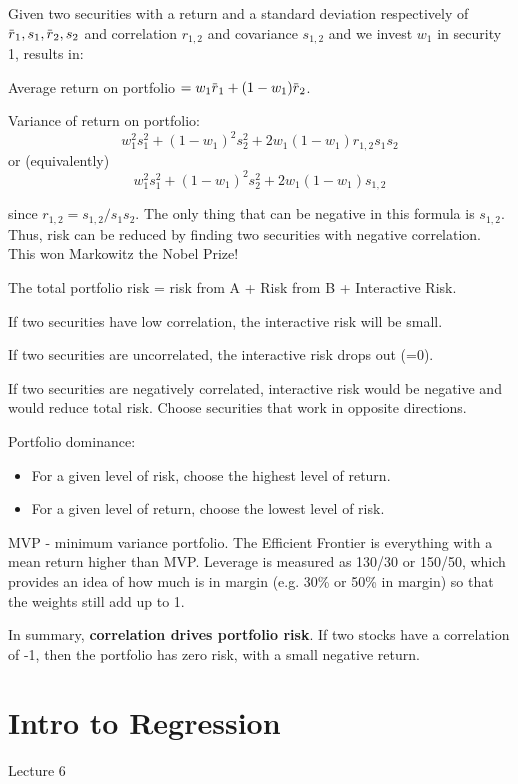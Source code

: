 \documentclass[11pt, oneside]{article}   	%
\newcommand{\overbar}[1]{\mkern 1.5mu\overline{\mkern-1.5mu#1\mkern-1.5mu}\mkern 1.5mu}
\begin{document}
Given two securities with a return and a standard deviation respectively of $\overbar{r}_1, s_1, \overbar{r}_2, s_2$ and correlation $r_{1,2}$ and covariance $s_{1,2}$ and we invest $w_1$ in security 1, results in:

Average return on portfolio $=w_1\overbar{r}_1 + (1-w_1)\overbar{r}_2$.

Variance of return on portfolio:
\[
w_1^2s_1^2 + (1-w_1)^2s_2^2 + 2w_1(1-w_1)r_{1,2}s_1s_2
\]
or (equivalently)
\[
w_1^2s_1^2 + (1-w_1)^2s_2^2 + 2w_1(1-w_1)s_{1,2}
\]

since $r_{1,2} = s_{1,2} / s_1s_2$. The only thing that can be negative in this formula is $s_{1,2}$. Thus, risk can be reduced by finding two securities with negative correlation. This won Markowitz the Nobel Prize!

The total portfolio risk = risk from A + Risk from B + Interactive Risk.

If two securities have low correlation, the interactive risk will be small.

If two securities are uncorrelated, the interactive risk drops out (=0).

If two securities are negatively correlated, interactive risk would be negative and would
reduce total risk. Choose securities that work in opposite directions.

Portfolio dominance:
\begin{itemize}
\item{For a given level of risk, choose the highest level of return.}

\item{For a given level of return, choose the lowest level of risk.}
\end{itemize}

MVP - minimum variance portfolio. The Efficient Frontier is everything with a mean return higher than MVP. Leverage is measured as 130/30 or 150/50, which provides an idea of how much is in margin (e.g. 30\% or 50\% in margin) so that the weights still add up to 1.

In summary, \textbf{correlation drives portfolio risk}. If two stocks have a correlation of -1, then the portfolio has zero risk, with a small negative return.

\section{Intro to Regression}

Lecture 6
\end{document}
